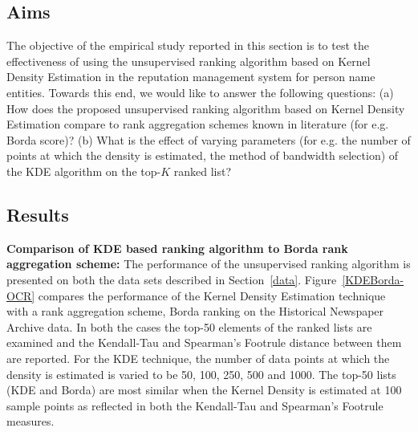 \documentclass[a4paper,man,natbib]{apa6}
\begin{document}
\subsection{Aims}
The objective of the empirical study reported in this section is to test the effectiveness of using the unsupervised ranking algorithm based on Kernel Density Estimation in the reputation management system for person name entities. Towards this end, we would like to answer the following questions: (a) How does the proposed unsupervised ranking algorithm based on Kernel Density Estimation compare to rank aggregation schemes known in literature (for e.g. Borda score)? (b) What is the effect of varying parameters (for e.g. the number of points at which the density is estimated, the method of bandwidth selection) of the KDE algorithm on the top-$K$ ranked list?  

\subsection{Results}
\textbf{Comparison of KDE based ranking algorithm to Borda rank aggregation scheme:}
The performance of the unsupervised ranking algorithm is presented on both the data sets described in Section~\ref{data}. Figure~\ref{KDEBorda-OCR} compares the performance of the Kernel Density Estimation technique with a rank aggregation scheme, Borda ranking on the Historical Newspaper Archive data. In both the cases the top-50 elements of the ranked lists are examined and the Kendall-Tau and Spearman's Footrule distance between them are reported. For the KDE technique, the number of data points at which the density is estimated is varied to be 50, 100, 250, 500 and 1000. The top-50 lists (KDE and Borda) are most similar when the Kernel Density is estimated at 100 sample points as reflected in both the Kendall-Tau and Spearman's Footrule measures.
\end{document}
